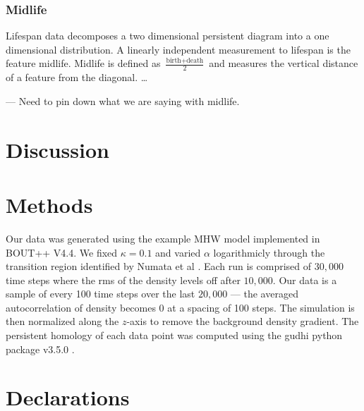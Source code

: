 \documentclass[pdflatex,sn-aps]{sn-jnl}%
\theoremstyle{thmstyleone}%
\theoremstyle{thmstyletwo}%
\theoremstyle{thmstylethree}%
\begin{document}
\subsubsection{Midlife}
\par
    Lifespan data decomposes a two dimensional persistent diagram into a one dimensional distribution.  A linearly independent measurement to lifespan is the feature midlife.  Midlife is defined as $\frac{\text{birth}+\text{death}}{2}$ and measures the vertical distance of a feature from the diagonal.  \ldots
    \par
    --- Need to pin down what we are saying with midlife.

\section{Discussion}

\section{Methods}\label{methods}
\par
Our data was generated using the example MHW model implemented in BOUT++ V4.4.  We fixed $\kappa=0.1$ and varied $\alpha$ logarithmicly through the transition region identified by Numata et al \cite{NUMATA2007}.  Each run is comprised of $30,000$ time steps where the rms of the density levels off after $10,000$.  Our data is a sample of every 100 time steps over the last $20,000$ --- the averaged autocorrelation of density becomes 0 at a spacing of 100 steps.  The simulation is then normalized along the $z$-axis to remove the background density gradient.  The persistent homology of each data point was computed using the gudhi python package v3.5.0 \cite{gudhi}.  
\backmatter%



\section*{Declarations}
\end{document}
